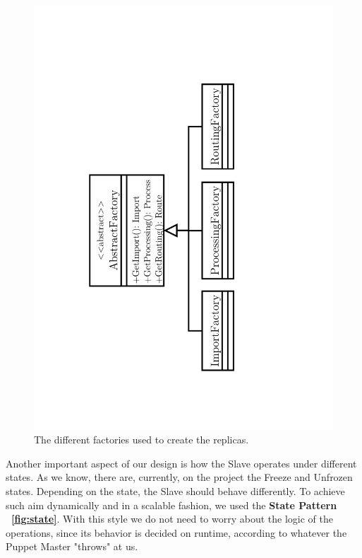 \documentclass[times, 10pt,twocolumn]{article}
\begin{document}
\begin{figure}[h]
\centering
	\includegraphics[scale=0.35]{"Architecture/Factories"}
    \caption{The different factories used to create the replicas. } 
    \label{fig:factories}
\end{figure}

Another important aspect of our design is how the Slave operates under different states. As we know, there are, currently, on the project the Freeze and Unfrozen states. Depending on the state, the Slave should behave differently. To achieve such aim dynamically and in a scalable fashion, we used the \textbf{State Pattern} \textbf{~\cref{fig:state}}. With this style we do not need to worry about the logic of the operations, since its behavior is decided on runtime, according to whatever the Puppet Master "throws" at us.
\end{document}

